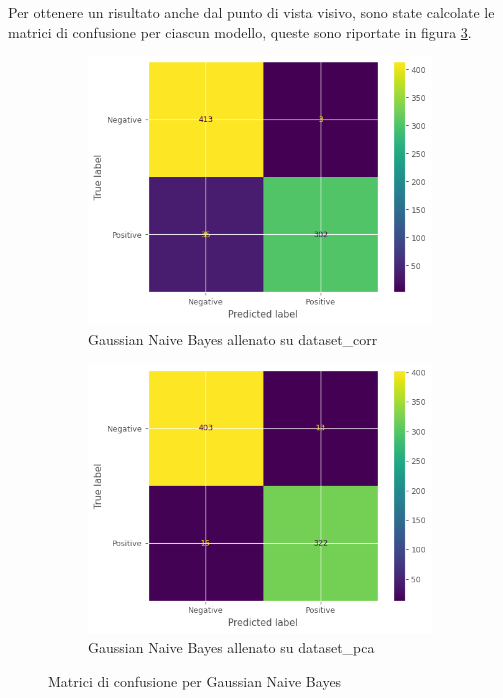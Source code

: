 Per ottenere un risultato anche dal punto di vista visivo, sono state calcolate
le matrici di confusione per ciascun modello, queste sono riportate in figura 
\ref{fig:matrice_di_confusione_per_GNB}.

\begin{figure}[!ht]
    \centering
    \begin{subfigure}{0.45\textwidth}
        \centering
        \includegraphics[width=\textwidth]{img/gnb/confusion_matrix_corr.png}
        \caption{Gaussian Naive Bayes allenato su dataset\_corr}
        \label{fig:matrice_di_confusione_per_GNB_corr}
    \end{subfigure}
    \hfill
    \begin{subfigure}{.45\textwidth}
        \centering
        \includegraphics[width=\textwidth]{img/gnb/confusion_matrix_pca.png}
        \caption{Gaussian Naive Bayes allenato su dataset\_pca}
        \label{fig:matrice_di_confusione_per_GNB_pca}
    \end{subfigure}
    \caption{Matrici di confusione per Gaussian Naive Bayes}
    \label{fig:matrice_di_confusione_per_GNB}
\end{figure}

